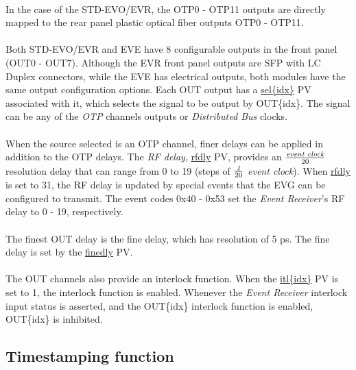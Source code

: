 \documentclass[openany]{article}
\begin{document}
		\paragraph{} In the case of the STD-EVO/EVR, the OTP0 - OTP11 outputs are directly mapped to the rear panel plastic optical fiber outputs OTP0 - OTP11.
		\paragraph{} Both STD-EVO/EVR and EVE have 8 configurable outputs in the front panel (OUT0 - OUT7). Although the EVR front panel outputs are SFP with LC Duplex connectors, while the EVE has electrical outputs, both modules have the same output configuration options. Each OUT output has a \hyperref[pvgroup:evre-out]{sel\{idx\}} PV associated with it, which selects the signal to be output by OUT\{idx\}. The signal can be any of the \emph{OTP} channels outputs or \emph{Distributed Bus} clocks.
		\paragraph{} When the source selected is an OTP channel, finer delays can be applied in addition to the OTP delays. The \emph{RF delay}, \hyperref[pvgroup:evre-out]{rfdly} PV, provides an \(\frac{\emph{event clock}}{20}\) resolution delay that can range from 0 to 19 (steps of \(\frac{\emph{1}}{20}\) \emph{event clock}). When \hyperref[pvgroup:evre-out]{rfdly} is set to 31, the RF delay is updated by special events that the EVG can be configured to transmit. The event codes 0x40 - 0x53 set the \emph{Event Receiver}'s RF delay to 0 - 19, respectively.
		\paragraph{} The finest OUT delay is the fine delay, which has resolution of 5 ps. The fine delay is set by the \hyperref[pvgroup:evre-out]{finedly} PV.
		\paragraph{} The OUT channels also provide an interlock function. When the \hyperref[pvgroup:evre-out]{itl\{idx\}} PV is set to 1, the interlock function is enabled. Whenever the \emph{Event Receiver} interlock input status is asserted, and the OUT\{idx\} interlock function is enabled, OUT\{idx\} is inhibited.

	\subsection{Timestamping function}
\end{document}
